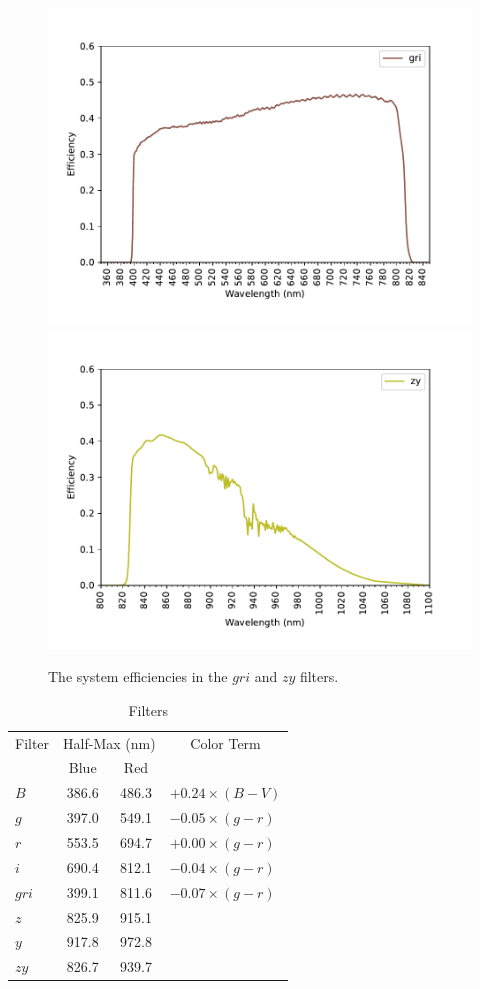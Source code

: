 \begin{figure}
\centering
\includegraphics[width=0.80\linewidth]{figure/system-gri.pdf}
\includegraphics[width=0.80\linewidth]{figure/system-zy.pdf}
\caption{The system efficiencies in the $gri$ and $zy$ filters.}
\label{figure:system-filters-last}
\end{figure}

\begin{table}
\centering
\caption{Filters}
\medskip
\label{table:filters}
\begin{tabular}{lccl}
\toprule
Filter&\multicolumn{2}{c}{Half-Max (nm)}&\multicolumn{1}{c}{Color Term}\\
\cmidrule{2-3}
&Blue&Red\\
\midrule
$B$   & 386.6 & 486.3 &$+0.24 \times (B-V)$\\
$g$   & 397.0 & 549.1 &$-0.05 \times (g-r)$\\
$r$   & 553.5 & 694.7 &$+0.00 \times (g-r)$\\
$i$   & 690.4 & 812.1 &$-0.04 \times (g-r)$\\
$gri$ & 399.1 & 811.6 &$-0.07 \times (g-r)$\\
$z$   & 825.9 & 915.1 \\
$y$   & 917.8 & 972.8 \\
$zy$  & 826.7 & 939.7 \\
\bottomrule
\end{tabular}
\end{table}

